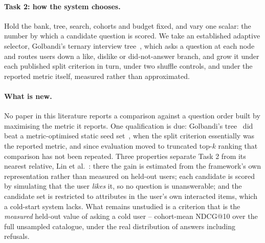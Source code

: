 \documentclass[runningheads]{llncs}
\begin{document}
\paragraph{Task 2: how the system chooses.}
Hold the bank, tree, search, cohorts and budget fixed, and vary one scalar: the number by which a
candidate question is scored. We take an established adaptive selector, Golbandi's ternary
interview tree~\cite{golbandi2011adaptive}, which asks a question at each node and routes users down
a like, dislike or did-not-answer branch, and grow it under each published split criterion in turn,
under two shuffle controls, and under the reported metric itself, measured rather than approximated.

\paragraph{What is new.}
No paper in this literature reports a comparison against a question order built by maximising the
metric it reports. One qualification is due: Golbandi's tree~\cite{golbandi2011adaptive} did beat a
metric-optimised static seed set~\cite{golbandi2010bootstrapping}, when the split criterion
essentially was the reported metric, and since evaluation moved to truncated top-$k$ ranking that
comparison has not been repeated. Three properties separate Task 2 from its nearest relative, Lin et
al.~\cite{lin2023upsrec}: there the gain is estimated from the framework's own representation rather
than measured on held-out users; each candidate is scored by simulating that the user \emph{likes}
it, so no question is unanswerable; and the candidate set is restricted to attributes in the user's
own interacted items, which a cold-start system lacks. What remains
unstudied is a criterion that is the \emph{measured} held-out value of asking a cold user --
cohort-mean NDCG@10 over the full unsampled catalogue, under the real distribution of answers
including refusals.
\end{document}
